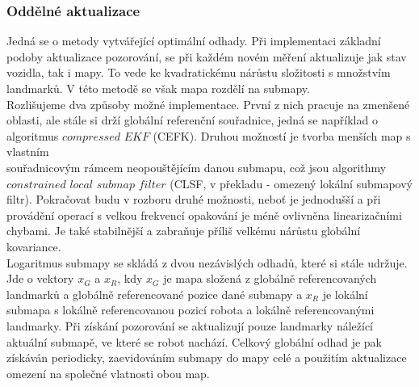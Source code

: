 \documentclass[12pt]{article}
\begin{document}
\subsubsection{Oddělné aktualizace}
Jedná se o metody vytvářející optimální odhady. Při implementaci základní podoby aktualizace pozorování, se při každém novém měření aktualizuje jak stav vozidla, tak i mapy. To vede ke kvadratickému nárůstu složitosti s množstvím landmarků. V této metodě se však mapa rozdělí na submapy.\\
\indent Rozlišujeme dva způsoby možné implementace. První z nich pracuje na zmenšené oblasti, ale stále si drží globální referenční souřadnice, jedná se například o algoritmus $compressed$ $EKF$ (CEFK). Druhou možností je tvorba menších map s vlastním\\ souřadnicovým rámcem neopouštějícím danou submapu, což jsou algorithmy $constrained$ $local$ $submap$ $filter$ (CLSF, v překladu - omezený lokální submapový filtr). Pokračovat budu v rozboru druhé možnosti, neboť je jednodušší a při provádění operací s velkou frekvencí opakování je méně ovlivněna linearizačními chybami. Je také stabilnější a zabraňuje příliš velkému nárůstu globální kovariance. \\
\indent Logaritmus submapy se skládá z dvou nezávislých odhadů, které si stále udržuje. Jde o vektory $x_G$ a $x_R$, kdy $x_G$ je mapa složená z globálně referencovaných landmarků a globálně referencované pozice dané submapy a $x_R$ je lokální submapa s lokálně referencovanou pozicí robota a lokálně referencovanými landmarky. Při získání pozorování se aktualizují pouze landmarky náležící aktuální submapě, ve které se robot nachází. Celkový globální odhad je pak získáván periodicky, zaevidováním submapy do mapy celé a použitím aktualizace omezení na společné vlatnosti obou map.
\end{document}
